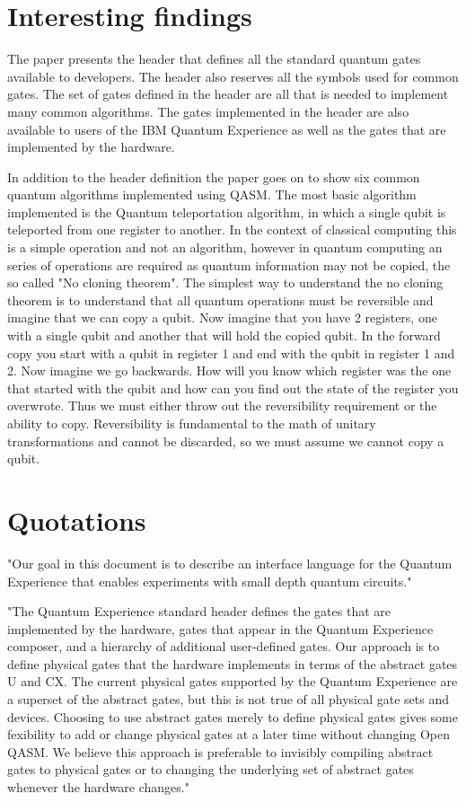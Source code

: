 \documentclass{article}
\begin{document}
\section{Interesting findings}

The paper presents the header that defines all the standard quantum gates available to developers. The header also reserves all the symbols used for common gates. The set of gates defined in the header are all that is needed to implement many common algorithms. The gates implemented in the header are also available to users of the IBM Quantum Experience as well as the gates that are implemented by the hardware.

In addition to the header definition the paper goes on to show six common quantum algorithms implemented using QASM. The most basic algorithm implemented is the Quantum teleportation algorithm, in which a single qubit is teleported from one register to another. In the context of classical computing this is a simple operation and not an algorithm, however in quantum computing an series of operations are required as quantum information may not be copied, the so called "No cloning theorem". The simplest way to understand the no cloning theorem is to understand that all quantum operations must be reversible and imagine that we can copy a qubit. Now imagine that you have 2 registers, one with a single qubit and another that will hold the copied qubit. In the forward copy you start with a qubit in register 1 and end with the qubit in register 1 and 2. Now imagine we go backwards. How will you know which register was the one that started with the qubit and how can you find out the state of the register you overwrote. Thus we must either throw out the reversibility requirement or the ability to copy. Reversibility is fundamental to the math of unitary transformations and cannot be discarded, so we must assume we cannot copy a qubit.

\section{Quotations}
"Our goal in this document is to describe an interface language for the Quantum Experience that enables experiments with small depth quantum circuits."



"The Quantum Experience standard header defines the gates that are implemented by the hardware, gates that appear in the Quantum Experience composer, and a hierarchy of additional user-defined gates. Our approach is to define physical gates that the hardware implements in terms of the abstract gates U and CX. The current physical gates supported by the Quantum Experience are a superset of the abstract gates, but this is not true of all physical gate sets and devices. Choosing to use abstract gates merely to define physical gates gives some fexibility to add or change physical gates at a later time without changing Open QASM. We believe this approach is preferable to invisibly compiling abstract gates to physical gates or to changing the underlying set of abstract gates whenever the hardware changes."
\end{document}
